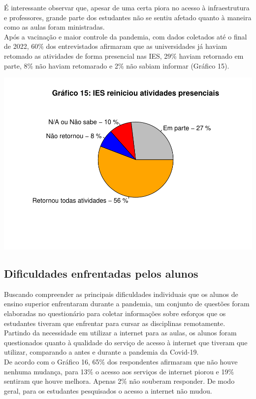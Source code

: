 \documentclass[
]{article}
\begin{document}
É interessante observar que, apesar de uma certa piora no acesso à
infraestrutura e professores, grande parte dos estudantes não se sentiu
afetado quanto à maneira como as aulas foram ministradas.\\
Após a vacinação e maior controle da pandemia, com dados coletados até o
final de 2022, 60\% dos entrevistados afirmaram que as universidades já
haviam retomado as atividades de forma presencial nas IES, 29\% haviam
retornado em parte, 8\% não haviam retomarado e 2\% não sabiam informar
(Gráfico 15).

\includegraphics{consequencias-oriundas-da-pandemia-v1.0_files/figure-latex/grafico-15-1.pdf}

\hypertarget{dificuldades-enfrentadas-pelos-alunos}{%
\subsection{Dificuldades enfrentadas pelos
alunos}\label{dificuldades-enfrentadas-pelos-alunos}}

Buscando compreender as principais dificuldades individuais que os
alunos de ensino superior enfrentaram durante a pandemia, um conjunto de
questões foram elaboradas no questionário para coletar informações sobre
esforços que os estudantes tiveram que enfrentar para cursar as
disciplinas remotamente.\\
Partindo da necessidade em utilizar a internet para as aulas, os alunos
foram questionados quanto à qualidade do serviço de acesso à internet
que tiveram que utilizar, comparando a antes e durante a pandemia da
Covid-19.\\
De acordo com o Gráfico 16, 65\% dos respondentes afirmaram que não
houve nenhuma mudança, para 13\% o acesso aos serviços de internet
piorou e 19\% sentiram que houve melhora. Apenas 2\% não souberam
responder. De modo geral, para os estudantes pesquisados o acesso a
internet não mudou.
\end{document}
